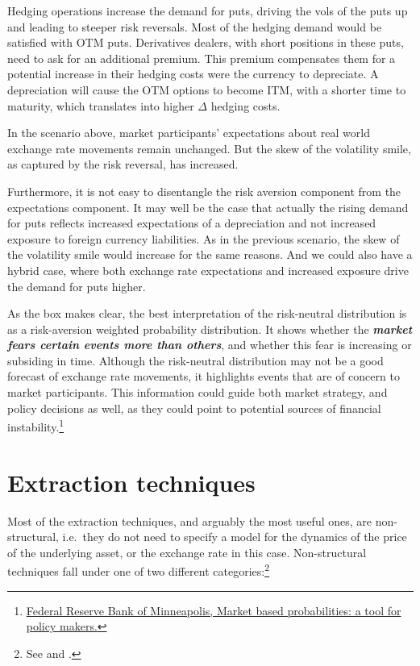 \documentclass[]{book}
\let\rmarkdownfootnote\footnote%
\def\footnote{\protect\rmarkdownfootnote}
\theoremstyle{definition}
\theoremstyle{definition}
\theoremstyle{definition}
\theoremstyle{remark}
\begin{document}
Hedging operations increase the demand for puts, driving the vols of the
puts up and leading to steeper risk reversals. Most of the hedging
demand would be satisfied with OTM puts. Derivatives dealers, with short
positions in these puts, need to ask for an additional premium. This
premium compensates them for a potential increase in their hedging costs
were the currency to depreciate. A depreciation will cause the OTM
options to become ITM, with a shorter time to maturity, which translates
into higher \(\Delta\) hedging costs.

In the scenario above, market participants' expectations about real
world exchange rate movements remain unchanged. But the skew of the
volatility smile, as captured by the risk reversal, has increased.

Furthermore, it is not easy to disentangle the risk aversion component
from the expectations component. It may well be the case that actually
the rising demand for puts reflects increased expectations of a
depreciation and not increased exposure to foreign currency liabilities.
As in the previous scenario, the skew of the volatility smile would
increase for the same reasons. And we could also have a hybrid case,
where both exchange rate expectations and increased exposure drive the
demand for puts higher.

As the box makes clear, the best interpretation of the risk-neutral
distribution is as a risk-aversion weighted probability distribution. It
shows whether the \textbf{\emph{market fears certain events more than
others}}, and whether this fear is increasing or subsiding in time.
Although the risk-neutral distribution may not be a good forecast of
exchange rate movements, it highlights events that are of concern to
market participants. This information could guide both market strategy,
and policy decisions as well, as they could point to potential sources
of financial instability.\footnote{\href{https://www.minneapolisfed.org/banking/mpd/resources/papers/market-based-probabilities-a-tool-for-policymakers}{Federal
  Reserve Bank of Minneapolis, Market based probabilities: a tool for
  policy makers.}}

\section{Extraction techniques}\label{extraction-techniques}

Most of the extraction techniques, and arguably the most useful ones,
are non-structural, i.e.~they do not need to specify a model for the
dynamics of the price of the underlying asset, or the exchange rate in
this case. Non-structural techniques fall under one of two different
categories:\footnote{See \citet{Mandler2003} and \citet{Jackwerth2004}.}
\end{document}

